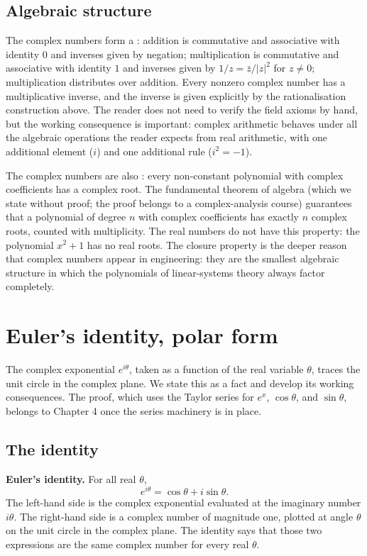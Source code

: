 \subsection{Algebraic structure}

The complex numbers form a : addition is
commutative and associative with identity $0$ and inverses given
by negation; multiplication is commutative and associative with
identity $1$ and inverses given by $1/z = \bar{z}/|z|^{2}$ for
$z \ne 0$; multiplication distributes over addition. Every
nonzero complex number has a multiplicative inverse, and the
inverse is given explicitly by the rationalisation construction
above. The reader does not need to verify the field axioms by
hand, but the working consequence is important: complex arithmetic
behaves under all the algebraic operations the reader expects from
real arithmetic, with one additional element ($i$) and one
additional rule ($i^{2} = -1$).

The complex numbers are also : every
non-constant polynomial with complex coefficients has a complex
root. The fundamental theorem of algebra (which we state without
proof; the proof belongs to a complex-analysis course) guarantees
that a polynomial of degree $n$ with complex coefficients has
exactly $n$ complex roots, counted with multiplicity. The real
numbers do not have this property: the polynomial $x^{2} + 1$ has
no real roots. The closure property is the deeper reason that
complex numbers appear in engineering: they are the smallest
algebraic structure in which the polynomials of linear-systems
theory always factor completely.

\section{Euler's identity, polar form}

The complex exponential $e^{i\theta}$, taken as a function of the
real variable $\theta$, traces the unit circle in the complex
plane. We state this as a fact and develop its working
consequences. The proof, which uses the Taylor series for
$e^{x}$, $\cos\theta$, and $\sin\theta$, belongs to Chapter 4 once
the series machinery is in place.

\subsection{The identity}

\textbf{Euler's identity.} For all real $\theta$,
\[
e^{i\theta} = \cos\theta + i\sin\theta.
\]
The left-hand side is the complex exponential evaluated at the
imaginary number $i\theta$. The right-hand side is a complex
number of magnitude one, plotted at angle $\theta$ on the unit
circle in the complex plane. The identity says that those two
expressions are the same complex number for every real $\theta$.

